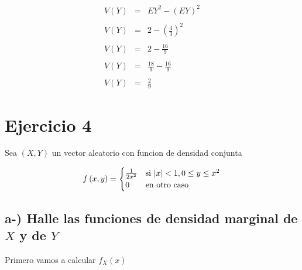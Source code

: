 \documentclass[12pt]{article}
\begin{document}
    \begin{equation*}
        \begin{array}{rcl}
            V(Y) & = & \displaystyle EY^2 - (EY)^2
            \\
            \\
            V(Y) & = & \displaystyle 2 - \left(\frac{4}{3}\right)^2
            \\
            \\
            V(Y) & = & \displaystyle 2 - \frac{16}{9}
            \\
            \\
            V(Y) & = & \displaystyle\frac{18}{9} - \frac{16}{9}
            \\
            \\
            V(Y) & = & \displaystyle\frac{2}{9}
        \end{array}
    \end{equation*}

    \section*{Ejercicio 4 } 

    \begin{flushleft}
        Sea $\left(X,Y\right)$  un vector aleatorio con funcion de densidad conjunta 
    \end{flushleft}

    \begin{equation*}
        f\left(x,y\right) = \begin{cases}
            \frac{1}{2x^2} & \mbox{si $ | x | < 1 , 0 \leq y \leq x^2$}
            \\
            0 & \mbox{en otro caso}
        \end{cases}
    \end{equation*}

    \subsection*{a-) Halle las funciones de densidad marginal de $X$ y de $Y$}

    \begin{flushleft}
        Primero vamos a calcular $f_{X}\left(x\right)$ 
    \end{flushleft}
\end{document}
